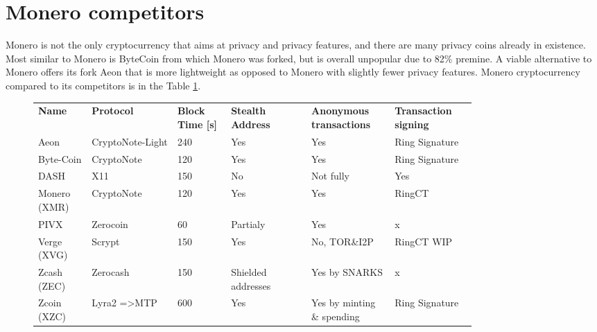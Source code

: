 \documentclass[
  printed, %
  table,   %
  lof,     %
  lot,     %
           oneside, color
]{fithesis3}
\begin{document}
\section{Monero competitors}
\label{sec:monero-timeline}
Monero is not the only cryptocurrency that aims at privacy and privacy features, and there are many privacy coins already in existence. Most similar to Monero is ByteCoin from which Monero was forked, but is overall unpopular due to 82\% premine. A viable alternative to Monero offers its fork Aeon that is more lightweight as opposed to Monero with slightly fewer privacy features. Monero cryptocurrency compared to its competitors is in the Table \ref{table:monero-alternatives}.

\begin{figure}[H]
\centering
\begin{tabular}{p{0.1\linewidth}p{0.16\linewidth}p{0.1\linewidth}p{0.15\linewidth}p{0.15\linewidth}p{0.15\linewidth}}
\textbf{Name}        & \textbf{Protocol}                & \textbf{Block Time {[}s{]}} & \textbf{Stealth Address    }      & \textbf{Anonymous transactions} & \textbf{Transaction signing}  \\
Aeon         & CryptoNote-Light        & 240                & Yes                      & Yes                & Ring Signature \\
Byte-Coin     & CryptoNote              & 120                & Yes                      & Yes                & Ring Signature \\
DASH         & X11                     & 150                & No                       & Not fully           & Yes            \\
Monero (XMR) & CryptoNote              & 120                & Yes                      & Yes                & RingCT         \\
PIVX         & Zerocoin                & 60                 & Partialy & Yes                & x              \\
Verge (XVG)  & Scrypt                  & 150                & Yes                      & No, TOR\&I2P       & RingCT WIP     \\
Zcash (ZEC)  & Zerocash                & 150                & Shielded addresses  & Yes by SNARKS    & x              \\
Zcoin (XZC)  & Lyra2 =\textgreater MTP & 600                & Yes                      & Yes by minting \& spending  & Ring Signature

\end{tabular}
\label{table:monero-alternatives}


\end{figure}
\end{document}
